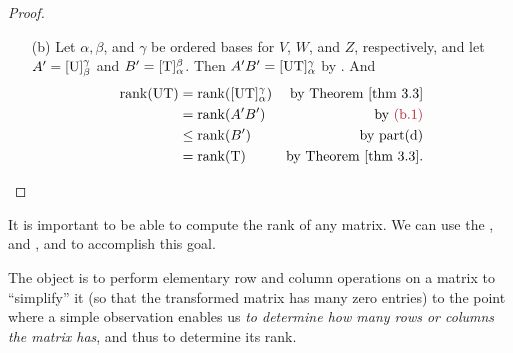 \begin{proof}
\begin{enumerate}
\item[(b)] Let \(\alpha, \beta\), and \(\gamma\) be ordered bases for \(V\), \(W\), and \(Z\), respectively,
and let \(A' = [\mathrm{U}]_{\beta}^{\gamma}\) and \(B' = [\mathrm{T}]_{\alpha}^{\beta}\).
Then \(A'B' = [\mathrm{U}\mathrm{T}]_{\alpha}^{\gamma}\)  by .
And 
\begin{align*}
    \rank(\U\T) & = \rank([\U\T]_{\alpha}^{\gamma}) & \text{by \THM{3.3}} \\
                & = \rank(A' B') & \text{by \MAROON{(b.1)}} \\
                & \le \rank(B') & \text{by part(d)} \\
                & = \rank(\T) & \text{by \THM{3.3}}.
\end{align*}
\end{enumerate}
\end{proof}

\begin{remark} \label{remark 3.2.5}
It is important to be able to compute the rank of any matrix.
We can use the ,  and , and  to accomplish this goal.

The object is to perform elementary row and column operations on a matrix to ``simplify'' it
(so that the transformed matrix has many zero entries)
to the point where a simple observation enables us \emph{to determine how many \LID{} rows or columns the matrix has}, and thus to determine its rank.
\end{remark}

